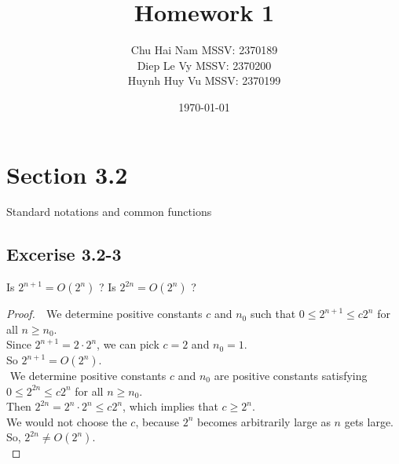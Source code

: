 \documentclass{article}
\title{Homework 1}
\author{Chu Hai Nam MSSV: 2370189 \\
        Diep Le Vy MSSV: 2370200 \\
        Huynh Huy Vu MSSV: 2370199 \\}
\date\today
\begin{document}
\maketitle %

\section*{Section 3.2}
Standard notations and common functions

\subsection*{Excerise 3.2-3}
Is $2^{n+1} = O(2^n)$ ? Is $2^{2n} = O(2^n)$ ?
\begin{proof}
    $ $\newline
    $ $\newline
    We determine positive constants $c$ and $n_0$ such that $0\le2^{n+1}\le c2^n$ for all $n\ge n_0$. \\
    Since $2^{n+1}=2\cdot2^n$, we can pick $c=2$ and $n_0=1$. \\
    So $2^{n+1}=O(2^n)$. \\
    $ $\newline
    We determine positive constants $c$ and $n_0$ are positive constants satisfying $0\le2^{2n}\le c2^n$ for all $n\ge n_0$. \\
    Then $2^{2n}=2^n\cdot2^n\le c2^n$, which implies that $c\ge2^n$. \\
    We would not choose the $c$, because $2^n$ becomes arbitrarily large as $n$ gets large. \\
    So, $2^{2n}\ne O(2^n)$. \\
\end{proof}

\newcommand{\Tworst}{T_{worst}(n)}
\newcommand{\Tbest}{T_{best}(n)}
\end{document}
